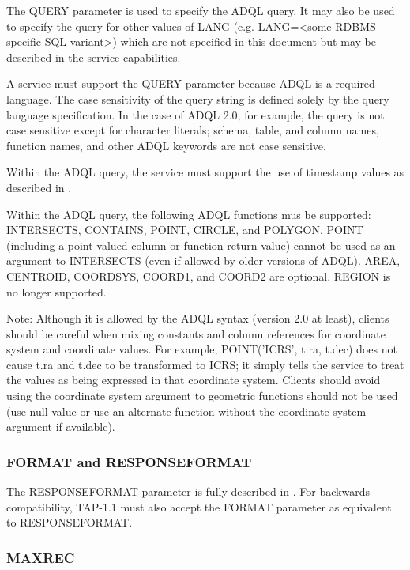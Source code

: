 \documentclass[11pt,letter]{ivoa}
\begin{document}
The QUERY parameter is used to specify the ADQL query. It may also be used to 
specify the query for other values of LANG (e.g. LANG=<some RDBMS-specific SQL 
variant>) which are not specified in this document but may be described in the 
service capabilities.

A service must support the QUERY parameter because ADQL is a required language.  
The case sensitivity of the query string is defined solely by the query language 
specification. In the case of ADQL 2.0, for example, the query is not case 
sensitive except for character  literals; schema, table, and column names, 
function names, and other ADQL keywords are not case sensitive.

Within the ADQL query, the service must support the use of timestamp values as 
described in \citep{std:DALI}.

Within the ADQL query, the following ADQL functions mus be supported: INTERSECTS,
CONTAINS, POINT, CIRCLE, and POLYGON. POINT (including a point-valued column or 
function return value) cannot be used as an argument to INTERSECTS (even if allowed
by older versions of ADQL).
AREA, CENTROID, COORDSYS, COORD1, and COORD2 are optional. REGION is no longer
supported. 

Note: Although it is allowed by the ADQL syntax (version 2.0 at least), clients should be careful when 
mixing constants and column references for coordinate system and coordinate 
values. For example, POINT('ICRS', t.ra, t.dec) does not cause t.ra and t.dec to 
be transformed to ICRS; it simply tells the service to treat the values  as 
being expressed in that coordinate system. Clients should avoid using the coordinate 
system argument to geometric functions should not be used (use null value or use an 
alternate function without the coordinate system argument if available).

\subsubsection{FORMAT and RESPONSEFORMAT}
\label{sec:RESPONSEFORMAT}

The RESPONSEFORMAT parameter is fully described in \citep{std:DALI}. For 
backwards 
compatibility, TAP-1.1 must also accept the FORMAT parameter as equivalent to 
RESPONSEFORMAT.

\subsubsection{MAXREC}
\label{sec:MAXREC}
\end{document}
